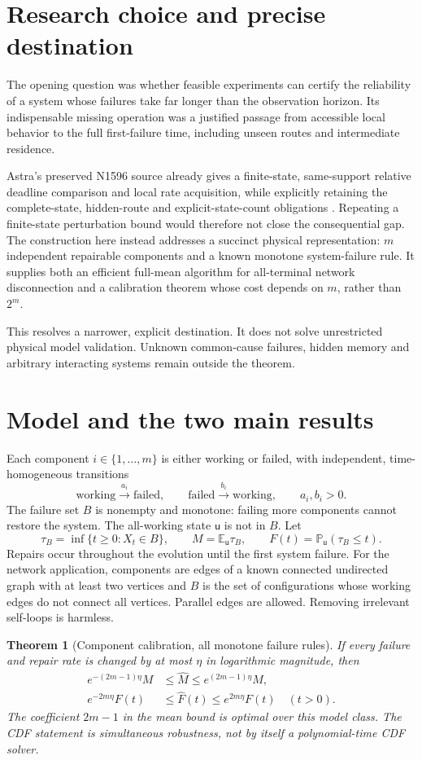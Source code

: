 \documentclass[11pt,a4paper]{article}
\newtheorem{theorem}{Theorem}
\newcommand{\E}{\mathbb E}
\newcommand{\Pp}{\mathbb P}
\newcommand{\up}{\mathsf u}
\begin{document}
\section{Research choice and precise destination}
The opening question was whether feasible experiments can certify the reliability of a system whose failures take far longer than the observation horizon. Its indispensable missing operation was a justified passage from accessible local behavior to the full first-failure time, including unseen routes and intermediate residence.

Astra's preserved N1596 source already gives a finite-state, same-support relative deadline comparison and local rate acquisition, while explicitly retaining the complete-state, hidden-route and explicit-state-count obligations \cite{astra}. Repeating a finite-state perturbation bound would therefore not close the consequential gap. The construction here instead addresses a succinct physical representation: $m$ independent repairable components and a known monotone system-failure rule. It supplies both an efficient full-mean algorithm for all-terminal network disconnection and a calibration theorem whose cost depends on $m$, rather than $2^m$.

This resolves a narrower, explicit destination. It does not solve unrestricted physical model validation. Unknown common-cause failures, hidden memory and arbitrary interacting systems remain outside the theorem.

\section{Model and the two main results}
Each component $i\in\{1,\ldots,m\}$ is either working or failed, with independent, time-homogeneous transitions
\[
\text{working}\xrightarrow{a_i}\text{failed},\qquad
\text{failed}\xrightarrow{b_i}\text{working},\qquad a_i,b_i>0.
\]
The failure set $B$ is nonempty and monotone: failing more components cannot restore the system. The all-working state $\up$ is not in $B$. Let
\[
\tau_B=\inf\{t\ge0:X_t\in B\},\qquad
M=\E_{\up}\tau_B,\qquad F(t)=\Pp_{\up}(\tau_B\le t).
\]
Repairs occur throughout the evolution until the first system failure. For the network application, components are edges of a known connected undirected graph with at least two vertices and $B$ is the set of configurations whose working edges do not connect all vertices. Parallel edges are allowed. Removing irrelevant self-loops is harmless.

\begin{theorem}[Component calibration, all monotone failure rules]\label{thm:cal}
If every failure and repair rate is changed by at most $\eta$ in logarithmic magnitude, then
\begin{align}
 e^{-(2m-1)\eta}M&\le \widehat M\le e^{(2m-1)\eta}M,\label{eq:meanrobust}\\
 e^{-2m\eta}F(t)&\le \widehat F(t)\le e^{2m\eta}F(t)\quad(t>0).\label{eq:cdfrobust}
\end{align}
The coefficient $2m-1$ in the mean bound is optimal over this model class. The CDF statement is simultaneous robustness, not by itself a polynomial-time CDF solver.
\end{theorem}
\end{document}

